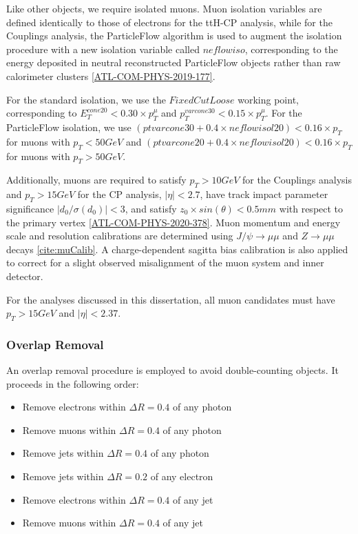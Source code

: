 Like other objects, we require isolated muons. Muon isolation variables are defined identically to those of electrons for the ttH-CP analysis, while for the Couplings analysis, the ParticleFlow algorithm is used to augment the isolation procedure with a new isolation variable called $neflowiso$, corresponding to the energy deposited in neutral reconstructed ParticleFlow objects rather than raw calorimeter clusters \ref{ATL-COM-PHYS-2019-177}. 

For the standard isolation, we use the $FixedCutLoose$ working point, corresponding to $E_{T}^{cone20}<0.30 \times p_{T}^{\mu}$ and $p_{T}^{varcone30}<0.15 \times p_{T}^{\mu}$. For the ParticleFlow isolation, we use $(ptvarcone30+ 0.4\times neflowisol20) <0.16 \times p_{T}$ for muons with $p_{T} < 50GeV$ and $(ptvarcone20+ 0.4\times neflowisol20) < 0.16 \times p_{T}$ for muons with $p_{T} > 50GeV$.

Additionally, muons are required to satisfy $p_{T} > 10 GeV$ for the Couplings analysis and $p_{T} > 15 GeV$ for the CP analysis, $|\eta| < 2.7$, have track impact parameter significance $|d_{0} / \sigma(d_{0})| < 3$, and satisfy $z_{0} \times sin(\theta) < 0.5 mm$ with respect to the primary vertex \ref{ATL-COM-PHYS-2020-378}. Muon momentum and energy scale and resolution calibrations are determined using $J/\psi \rightarrow \mu \mu$ and $Z \rightarrow \mu \mu$ decays \ref{cite:muCalib}. A charge-dependent sagitta bias calibration is also applied to correct for a slight observed misalignment of the muon system and inner detector.

For the analyses discussed in this dissertation, all muon candidates must have $p_{T} > 15 GeV$ and $|\eta| < 2.37$.
 
\subsubsection{Overlap Removal} \label{sec:Overlap}

An overlap removal procedure is employed to avoid double-counting objects. It proceeds in the following order:

\begin{itemize}
\item Remove electrons within $\Delta R=0.4$ of any photon
\item Remove muons within $\Delta R=0.4$ of any photon
\item Remove jets within $\Delta R=0.4$ of any photon
\item Remove jets within $\Delta R=0.2$ of any electron
\item Remove electrons within $\Delta R=0.4$ of any jet
\item Remove muons within $\Delta R=0.4$ of any jet
\end{itemize}

